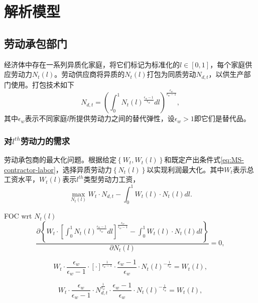 \section{解析模型}
\label{sec:MSDSGE-model}
\subsection{劳动承包部门}
经济体中存在一系列异质化家庭，将它们标记为标准化的$l \in [0,1]$，每个家庭供应劳动力$N_t(l)$。劳动供应商将异质的$N_t(l)$打包为同质劳动$N_{d,t}$，以供生产部门使用。打包技术如下
\begin{equation}
\label{eq:MS-contractor-labor}
N_{d,t} = \left(
\int_{0}^{1} N_t(l)^{\frac{\epsilon_w -1}{\epsilon_w}} d l
\right)^{\frac{\epsilon_w}{\epsilon_w -1}},
\end{equation}
其中$\epsilon_w$表示不同家庭$l$所提供劳动力之间的替代弹性，设$\epsilon_w >1$即它们是替代品。

\subsubsection{对$l^{th}$劳动力的需求}
劳动承包商的最大化问题。根据给定$\left\{ W_t, W_t(l)\right\}$和既定产出条件式\eqref{eq:MS-contractor-labor}，选择异质劳动力$\left\{ N_t(l) \right\}$以实现利润最大化。其中$W_t$表示总工资水平，$W_{t}(l)$表示$l^{th}$类型劳动力工资，
\begin{equation*}
\max_{N_t(l)} W_t \cdot N_{d,t} - \int_{0}^{1} W_t(l) \cdot N_t(l) d l.
\end{equation*}

FOC wrt $N_t(l)$
\begin{equation*}
\frac{\partial \left\{
W_t \cdot \left[
\int_{0}^{1} N_t(l)^{\frac{\epsilon_w -1}{\epsilon_w}} d l
\right]^{\frac{\epsilon_w}{\epsilon_w -1}} - \int_{0}^{1} W_t(l) \cdot N_t(l) d l
\right\}}{
  \partial N_t(l)
} = 0,
\end{equation*}

\begin{equation*}
W_t \cdot \frac{\epsilon_w}{\epsilon_w -1} \cdot \left[ \cdot \right]^{\frac{1}{\epsilon_w -1}} \cdot \frac{\epsilon_w -1}{\epsilon_w} \cdot N_t(l)^{-\frac{1}{\epsilon_w}} = W_t(l),
\end{equation*}

\begin{equation*}
W_t \cdot \frac{\epsilon_w}{\epsilon_w -1} \cdot N_{d,t}^{\frac{1}{\epsilon_w}} \cdot \frac{\epsilon_w -1}{\epsilon_w} \cdot N_t(l)^{-\frac{1}{\epsilon_w}} = W_t(l),
\end{equation*}

